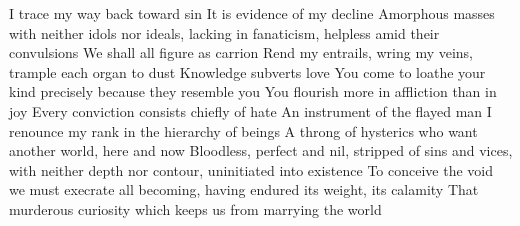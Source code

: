 \documentclass{article}
\begin{document}
I trace my way back toward sin
It is evidence of my decline
Amorphous masses with neither idols nor ideals, lacking in fanaticism, helpless amid their convulsions
We shall all figure as carrion
Rend my entrails, wring my veins, trample each organ to dust
Knowledge subverts love
You come to loathe your kind precisely because they resemble you
You flourish more in affliction than in joy
Every conviction consists chiefly of hate
An instrument of the flayed man
I renounce my rank in the hierarchy of beings
A throng of hysterics who want another world, here and now
Bloodless, perfect and nil, stripped of sins and vices, with neither depth nor contour, uninitiated into existence
To conceive the void we must execrate all becoming, having endured its weight, its calamity
That murderous curiosity which keeps us from marrying the world
\fi
\end{document}
